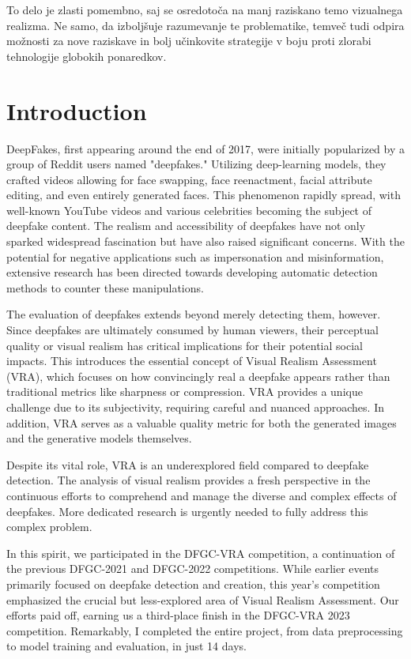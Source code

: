 \documentclass[a4paper,12pt,openright]{book}
\newcommand{\clearemptydoublepage}{\newpage{\pagestyle{empty}\cleardoublepage}}
\begin{document}
To delo je zlasti pomembno, saj se osredotoča na manj raziskano temo vizualnega realizma. Ne samo, da izboljšuje razumevanje te problematike, temveč tudi odpira možnosti za nove raziskave in bolj učinkovite strategije v boju proti zlorabi tehnologije globokih ponaredkov.


\bigskip

\clearemptydoublepage


\mainmatter
\setcounter{page}{1}
\pagestyle{fancy}

\chapter{Introduction}
\label{chap:introduction}
DeepFakes, first appearing around the end of 2017, were initially popularized by a group of Reddit users named "deepfakes." Utilizing deep-learning models, they crafted videos allowing for face swapping, face reenactment, facial attribute editing, and even entirely generated faces. This phenomenon rapidly spread, with well-known YouTube videos and various celebrities becoming the subject of deepfake content. The realism and accessibility of deepfakes have not only sparked widespread fascination but have also raised significant concerns. With the potential for negative applications such as impersonation and misinformation, extensive research has been directed towards developing automatic detection methods to counter these manipulations.

The evaluation of deepfakes extends beyond merely detecting them, however. Since deepfakes are ultimately consumed by human viewers, their perceptual quality or visual realism has critical implications for their potential social impacts. This introduces the essential concept of Visual Realism Assessment (VRA), which focuses on how convincingly real a deepfake appears rather than traditional metrics like sharpness or compression. VRA provides a unique challenge due to its subjectivity, requiring careful and nuanced approaches. In addition, VRA serves as a valuable quality metric for both the generated images and the generative models themselves.

Despite its vital role, VRA is an underexplored field compared to deepfake detection. The analysis of visual realism provides a fresh perspective in the continuous efforts to comprehend and manage the diverse and complex effects of deepfakes. More dedicated research is urgently needed to fully address this complex problem.

In this spirit, we participated in the DFGC-VRA competition, a continuation of the previous DFGC-2021 and DFGC-2022 competitions. While earlier events primarily focused on deepfake detection and creation, this year's competition emphasized the crucial but less-explored area of Visual Realism Assessment. Our efforts paid off, earning us a third-place finish in the DFGC-VRA 2023 competition.  Remarkably, I completed the entire project, from data preprocessing to model training and evaluation, in just 14 days.
\end{document}

